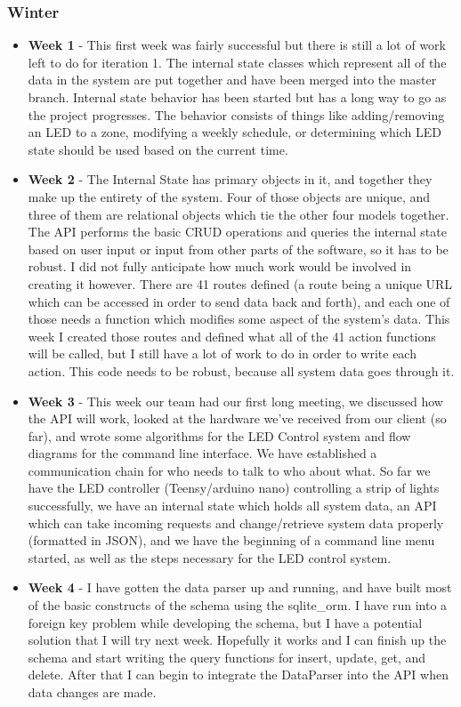 \documentclass[onecolumn, draftclsnofoot,10pt, compsoc]{IEEEtran}
\begin{document}
			\subsubsection{Winter}
			\begin{itemize}
					\item \textbf{Week 1} - This first week was fairly successful but there is still a lot of work left to do for iteration 1. The internal state classes which represent all of the data in the system are put together and have been merged into the master branch. Internal state behavior has been started but has a long way to go as the project progresses. The behavior consists of things like adding/removing an LED to a zone, modifying a weekly schedule, or determining which LED state should be used based on the current time. 
					\item \textbf{Week 2} - The Internal State has primary objects in it, and together they make up the entirety of the system. Four of those objects are unique, and three of them are relational objects which tie the other four models together. The API performs the basic CRUD operations and queries the internal state based on user input or input from other parts of the software, so it has to be robust. I did not fully anticipate how much work would be involved in creating it however. There are 41 routes defined (a route being a unique URL which can be accessed in order to send data back and forth), and each one of those needs a function which modifies some aspect of the system's data. This week I created those routes and defined what all of the 41 action functions will be called, but I still have a lot of work to do in order to write each action. This code needs to be robust, because all system data goes through it. 
					\item \textbf{Week 3} - This week our team had our first long meeting, we discussed how the API will work, looked at the hardware we've received from our client (so far), and wrote some algorithms for the LED Control system and flow diagrams for the command line interface. We have established a communication chain for who needs to talk to who about what. So far we have the LED controller (Teensy/arduino nano) controlling a strip of lights successfully, we have an internal state which holds all system data, an API which can take incoming requests and change/retrieve system data properly (formatted in JSON), and we have the beginning of a command line menu started, as well as the steps necessary for the LED control system. 
					\item \textbf{Week 4} - I have gotten the data parser up and running, and have built most of the basic constructs of the schema using the sqlite\_orm. I have run into a foreign key problem while developing the schema, but I have a potential solution that I will try next week. Hopefully it works and I can finish up the schema and start writing the query functions for insert, update, get, and delete. After that I can begin to integrate the DataParser into the API when data changes are made. 

\end{itemize}
\end{document}
